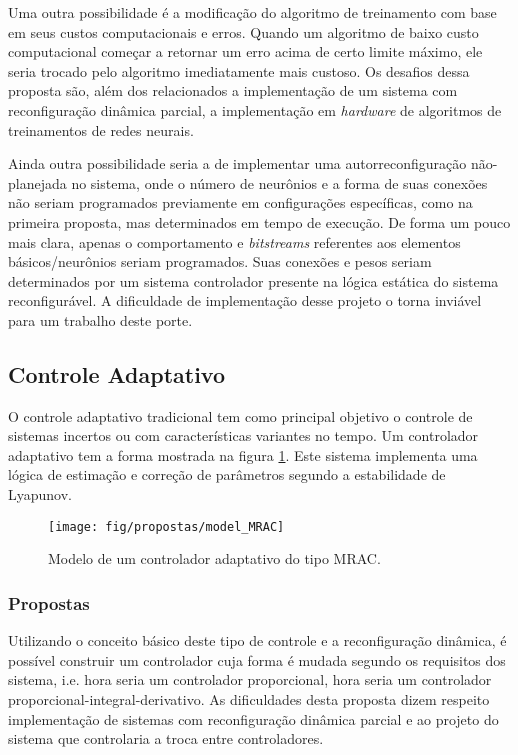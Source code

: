 \documentclass[11pt,a4paper,oneside]{book}
\begin{document}
Uma outra possibilidade \'e a modifica\c{c}\~ao do algoritmo de treinamento com base em seus custos computacionais e erros.
Quando um algoritmo de baixo custo computacional come\c{c}ar a retornar um erro acima de certo limite m\'aximo, ele seria trocado pelo algoritmo imediatamente mais custoso.
Os desafios dessa proposta s\~ao, al\'em dos relacionados a implementa\c{c}\~ao de um sistema com reconfigura\c{c}\~ao dinâmica parcial, a implementa\c{c}\~ao em \textit{hardware} de algoritmos de treinamentos de redes neurais.

Ainda outra possibilidade seria a de implementar uma autorreconfigura\c{c}\~ao n\~ao-planejada no sistema, onde o n\'umero de neur\^onios e a forma de suas conex\~oes n\~ao seriam programados previamente em configura\c{c}\~oes específicas, como na primeira proposta, mas determinados em tempo de execu\c{c}\~ao.
De forma um pouco mais clara, apenas o comportamento e \textit{bitstreams} referentes aos elementos b\'asicos/neur\^onios seriam programados.
Suas conex\~oes e pesos seriam determinados por um sistema controlador presente na l\'ogica est\'atica do sistema reconfigur\'avel.
A dificuldade de implementa\c{c}\~ao desse projeto o torna invi\'avel para um trabalho deste porte.

\subsection{Controle Adaptativo}
O controle adaptativo tradicional tem como principal objetivo o controle de sistemas incertos ou com características variantes no tempo.
Um controlador adaptativo tem a forma mostrada na figura \ref{fig:cadapt}.
Este sistema implementa uma l\'ogica de estima\c{c}\~ao e corre\c{c}\~ao de parâmetros segundo a estabilidade de Lyapunov.

\begin{figure}[h]
\centering
\texttt{[image: fig/propostas/model\_MRAC]}
\caption{Modelo de um controlador adaptativo do tipo MRAC.}
\label{fig:cadapt}
\end{figure}

\subsubsection{Propostas}
Utilizando o conceito básico deste tipo de controle e a reconfiguração dinâmica, é possível construir um controlador cuja forma é mudada segundo os requisitos dos sistema, i.e. hora seria um controlador proporcional, hora seria um controlador proporcional-integral-derivativo.
As dificuldades desta proposta dizem respeito implementa\c{c}\~ao de sistemas com reconfigura\c{c}\~ao dinâmica parcial e ao projeto do sistema que controlaria a troca entre controladores.
\end{document}
